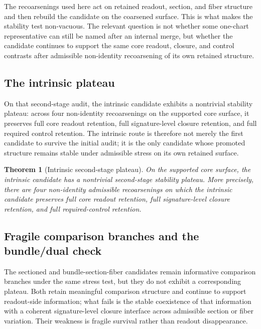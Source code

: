 \documentclass[11pt]{article}
\newtheorem{theorem}{Theorem}[section]
\theoremstyle{definition}
\begin{document}
The recoarsenings used here act on retained readout, section, and fiber structure and then rebuild the candidate on the coarsened surface. This is what makes the stability test non-vacuous. The relevant question is not whether some one-chart representative can still be named after an internal merge, but whether the candidate continues to support the same core readout, closure, and control contrasts after admissible non-identity recoarsening of its own retained structure.

\subsection{The intrinsic plateau}

On that second-stage audit, the intrinsic candidate exhibits a nontrivial stability plateau: across four non-identity recoarsenings on the supported core surface, it preserves full core readout retention, full signature-level closure retention, and full required control retention. The intrinsic route is therefore not merely the first candidate to survive the initial audit; it is the only candidate whose promoted structure remains stable under admissible stress on its own retained surface.

\begin{theorem}[Intrinsic second-stage plateau]
\label{thm:intrinsic-plateau}
On the supported core surface, the intrinsic candidate has a nontrivial second-stage stability plateau. More precisely, there are four non-identity admissible recoarsenings on which the intrinsic candidate preserves full core readout retention, full signature-level closure retention, and full required-control retention.
\end{theorem}

\subsection{Fragile comparison branches and the bundle/dual check}

The sectioned and bundle-section-fiber candidates remain informative comparison branches under the same stress test, but they do not exhibit a corresponding plateau. Both retain meaningful comparison structure and continue to support readout-side information; what fails is the stable coexistence of that information with a coherent signature-level closure interface across admissible section or fiber variation. Their weakness is fragile survival rather than readout disappearance.
\end{document}
